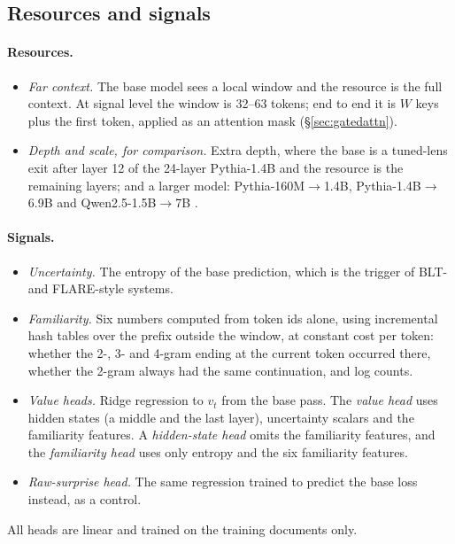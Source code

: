 \documentclass[11pt]{article}
\begin{document}
\subsection{Resources and signals}
\paragraph{Resources.}
\begin{itemize}
\item \emph{Far context.} The base model sees a local window and the resource is the full context. At signal level the window is 32--63 tokens; end to end it is $W$ keys plus the first token, applied as an attention mask (\S\ref{sec:gatedattn}).
\item \emph{Depth and scale, for comparison.} Extra depth, where the base is a tuned-lens exit \citep{belrose2023tunedlens} after layer 12 of the 24-layer Pythia-1.4B and the resource is the remaining layers; and a larger model: Pythia-160M$\to$1.4B, Pythia-1.4B$\to$6.9B and Qwen2.5-1.5B$\to$7B \citep{biderman2023pythia,qwen2024qwen25}.
\end{itemize}

\paragraph{Signals.}
\begin{itemize}
\item \emph{Uncertainty.} The entropy of the base prediction, which is the trigger of BLT- and FLARE-style systems.
\item \emph{Familiarity.} Six numbers computed from token ids alone, using incremental hash tables over the prefix outside the window, at constant cost per token: whether the 2-, 3- and 4-gram ending at the current token occurred there, whether the 2-gram always had the same continuation, and log counts.
\item \emph{Value heads.} Ridge regression to $v_t$ from the base pass. The \emph{value head} uses hidden states (a middle and the last layer), uncertainty scalars and the familiarity features. A \emph{hidden-state head} omits the familiarity features, and the \emph{familiarity head} uses only entropy and the six familiarity features.
\item \emph{Raw-surprise head.} The same regression trained to predict the base loss instead, as a control.
\end{itemize}
All heads are linear and trained on the training documents only.
\end{document}
